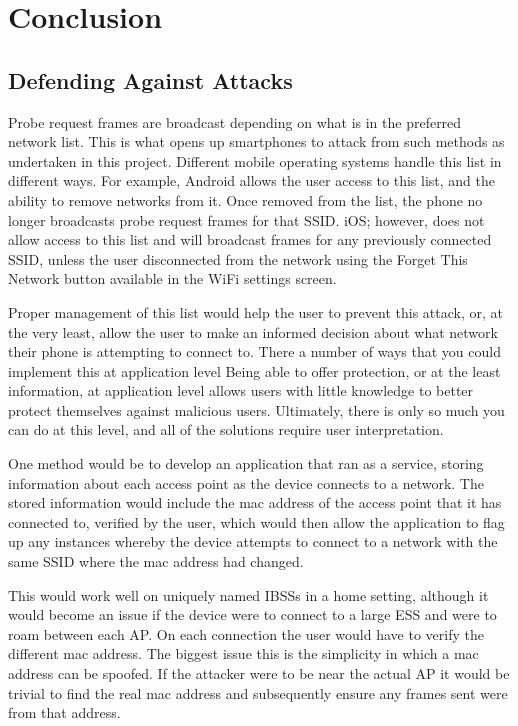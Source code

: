 \section{Conclusion}
\subsection{Defending Against Attacks}
Probe request frames are broadcast depending on what is in the preferred network list. This is what opens up smartphones to attack from such methods as undertaken in this project. Different mobile operating systems handle this list in different ways. For example, Android allows the user access to this list, and the ability to remove networks from it. Once removed from the list, the phone no longer broadcasts probe request frames for that SSID. iOS; however, does not allow access to this list and will broadcast frames for any previously connected SSID, unless the user disconnected from the network using the Forget This Network button available in the WiFi settings screen.

Proper management of this list would help the user to prevent this attack, or, at the very least, allow the user to make an informed decision about what network their phone is attempting to connect to. There a number of ways that you could implement this at application level Being able to offer protection, or at the least information, at application level allows users with little knowledge to better protect themselves against malicious users. Ultimately, there is only so much you can do at this level, and all of the solutions require user interpretation.

One method would be to develop an application that ran as a service, storing information about each access point as the device connects to a network. The stored information would include the mac address of the access point that it has connected to, verified by the user, which would then allow the application to flag up any instances whereby the  device attempts to connect to a network with the same SSID where the mac address had changed.

This would work well on uniquely named IBSSs in a home setting, although it would become an issue if the device were to connect to a large ESS and were to roam between each AP. On each connection the user would have to verify the different mac address. The biggest issue this  is the simplicity in which a mac address can be spoofed. If the attacker were to be near the actual AP it would be trivial to find the real mac address and subsequently ensure any frames sent were from that address.

